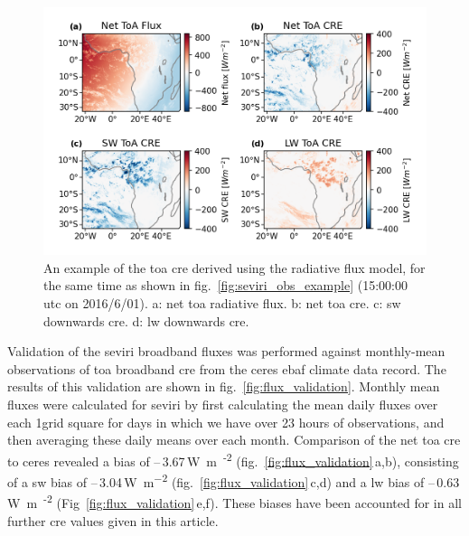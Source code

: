 \documentclass[acp, manuscript]{copernicus}
\begin{document}
\begin{figure}[tp]
    \includegraphics[width=12cm]{figures/fig02.png}
    \caption[
    An example of the \acrshort{toa} \acrshort{cre} derived using the radiative flux model
    ]{
    An example of the \acrshort{toa} \acrshort{cre} derived using the radiative flux model, for the same time
    as shown in fig.~\ref{fig:seviri_obs_example} (15:00:00 \acrshort{utc} on 2016/6/01). a: net \acrshort{toa} radiative flux. b: net \acrshort{toa} \acrshort{cre}. c: \acrshort{sw} downwards \acrshort{cre}. d: \acrshort{lw} downwards \acrshort{cre}.
    }
    \label{fig:seviri_flux_example}
\end{figure}


Validation of the \acrshort{seviri} broadband fluxes was performed against monthly-mean observations of \acrshort{toa} broadband \acrshort{cre} from the \acrfull{ceres} \citep{loeb_clouds_2018} \acrfull{ebaf} climate data record. 
The results of this validation are shown in fig.~\ref{fig:flux_validation}. 
Monthly mean fluxes were calculated for \acrshort{seviri} by first calculating the mean daily fluxes over each 1\textdegree grid square for days in which we have over 23 hours of observations, and then averaging these daily means over each month. 
Comparison of the net \acrshort{toa} \acrshort{cre} to \acrshort{ceres} revealed a bias of --\,3.67\,\unit{W m\textsuperscript{-2}} (fig.~\ref{fig:flux_validation}\,a,b), consisting of a \acrshort{sw} bias of --\,3.04\,\unit{W m^{-2}} (fig.~\ref{fig:flux_validation}\,c,d) and a \acrshort{lw} bias of --\,0.63\,\unit{W m\textsuperscript{-2}} (Fig~\ref{fig:flux_validation}\,e,f). 
These biases have been accounted for in all further \acrshort{cre} values given in this article.
\end{document}
